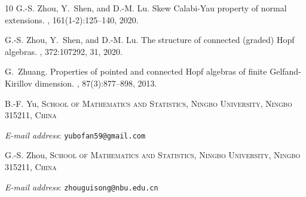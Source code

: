 \documentclass{article}
\makeatletter
\theoremstyle{plain}
\theoremstyle{definition}
\numberwithin{equation}{section}
\newcommand{\Addresses}{{%
		\bigskip
		\footnotesize
		
		B.-F. Yu, \textsc{School of Mathematics and Statistics, Ningbo University, Ningbo 315211, China}\par\nopagebreak
		\textit{E-mail address}: \texttt{yubofan59@gmail.com}
		
		\medskip
		
		G.-S. Zhou, \textsc{School of Mathematics and Statistics, Ningbo University, Ningbo 315211, China}\par\nopagebreak
		\textit{E-mail address}: \texttt{zhouguisong@nbu.edu.cn}
}}
\makeatother
\begin{document}
\begin{thebibliography}{10}
G.-S. Zhou, Y.~Shen, and D.-M. Lu.
\newblock Skew {C}alabi-{Y}au property of normal extensions.
, 161(1-2):125--140, 2020.

G.-S. Zhou, Y.~Shen, and D.-M. Lu.
\newblock The structure of connected (graded) {H}opf algebras.
, 372:107292, 31, 2020.

G.~Zhuang.
\newblock Properties of pointed and connected {H}opf algebras of finite
  {G}elfand-{K}irillov dimension.
, 87(3):877--898, 2013.

\end{thebibliography}

\Addresses
\end{document}
